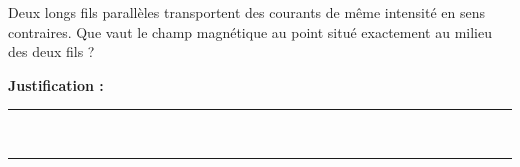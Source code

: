 Deux longs fils parallèles transportent des courants de même intensité en sens contraires. Que vaut le champ magnétique au point situé exactement au milieu des deux fils ?

\choices

\noindent\textbf{Justification :} \hrulefill \\[2.5ex]
\rule{\linewidth}{0.4pt} \\[2.5ex]
\rule{\linewidth}{0.4pt}
\vfill
